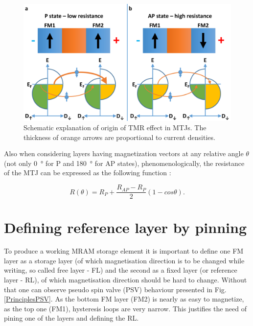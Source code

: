     \begin{figure}[H]
        \centering
        \includegraphics[width=0.75\paperwidth, page=1]{img/03/TMR_explanation.pdf}
        \caption{Schematic explanation of origin of TMR effect in MTJs. The thickness of orange arrows are proportional to current densities.}
        \label{PrinciplesTMRExplanation}
    \end{figure}	
	
	Also when considering layers having magnetization vectors at any relative angle $\theta$ (not only \SI{0}{\degree} for P and \SI{180}{\degree} for AP states), phenomenologically, the resistance of the MTJ can be expressed as the following function \cite{rijks1994interplay}:
	
	\begin{equation} \label{eq:Rangular}
		R(\theta) = R_P + \frac{R_{AP} - R_P}{2}(1-cos\theta).
	\end{equation}

\section{Defining reference layer by pinning} \label{sec:PrinciplesAdditionalPinning}

    To produce a working MRAM storage element it is important to define one FM layer as a storage layer (of which magnetisation direction is to be changed while writing, so called free layer - FL) and the second as a fixed layer (or reference layer - RL), of which magnetisation direction should be hard to change. Without that one can observe pseudo spin valve (PSV) behaviour presented in Fig. \ref{PrinciplesPSV}. As the bottom FM layer (FM2) is nearly as easy to magnetize, as the top one (FM1), hysteresis loops are very narrow. This justifies the need of pining one of the layers and defining the RL.
    
